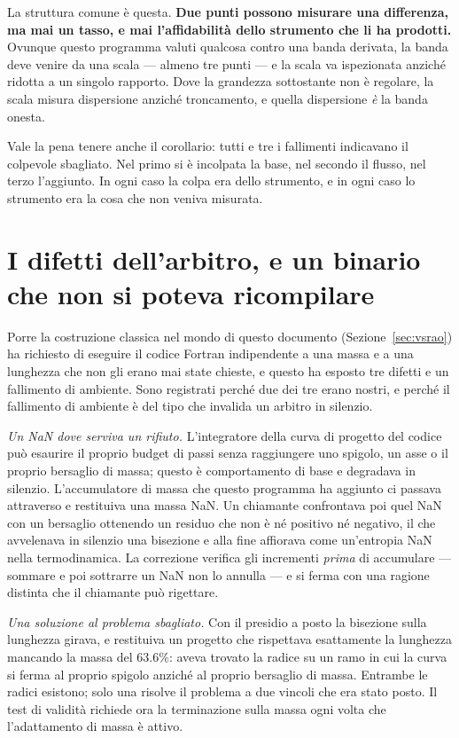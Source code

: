 La struttura comune è questa. \textbf{Due punti possono misurare una
differenza, ma mai un tasso, e mai l'affidabilità dello strumento che
li ha prodotti.} Ovunque questo programma valuti qualcosa contro una
banda derivata, la banda deve venire da una scala --- almeno tre
punti --- e la scala va ispezionata anziché ridotta a un singolo
rapporto. Dove la grandezza sottostante non è regolare, la scala
misura dispersione anziché troncamento, e quella dispersione \emph{è}
la banda onesta.

Vale la pena tenere anche il corollario: tutti e tre i fallimenti
indicavano il colpevole sbagliato. Nel primo si è incolpata la base,
nel secondo il flusso, nel terzo l'aggiunto. In ogni caso la colpa era
dello strumento, e in ogni caso lo strumento era la cosa che non
veniva misurata.

\section{I difetti dell'arbitro, e un binario che non si poteva
ricompilare}
\label{app:geno}

Porre la costruzione classica nel mondo di questo documento
(Sezione~\ref{sec:vsrao}) ha richiesto di eseguire il codice Fortran
indipendente a una massa e a una lunghezza che non gli erano mai state
chieste, e questo ha esposto tre difetti e un fallimento di ambiente.
Sono registrati perché due dei tre erano nostri, e perché il
fallimento di ambiente è del tipo che invalida un arbitro in
silenzio.

\emph{Un NaN dove serviva un rifiuto.} L'integratore della curva di
progetto del codice può esaurire il proprio budget di passi senza
raggiungere uno spigolo, un asse o il proprio bersaglio di massa;
questo è comportamento di base e degradava in silenzio. L'accumulatore
di massa che questo programma ha aggiunto ci passava attraverso e
restituiva una massa NaN. Un chiamante confrontava poi quel NaN con un
bersaglio ottenendo un residuo che non è né positivo né negativo, il
che avvelenava in silenzio una bisezione e alla fine affiorava come
un'entropia NaN nella termodinamica. La correzione verifica gli
incrementi \emph{prima} di accumulare --- sommare e poi sottrarre un
NaN non lo annulla --- e si ferma con una ragione distinta che il
chiamante può rigettare.

\emph{Una soluzione al problema sbagliato.} Con il presidio a posto la
bisezione sulla lunghezza girava, e restituiva un progetto che
rispettava esattamente la lunghezza mancando la massa del $63.6\%$:
aveva trovato la radice su un ramo in cui la curva si ferma al proprio
spigolo anziché al proprio bersaglio di massa. Entrambe le radici
esistono; solo una risolve il problema a due vincoli che era stato
posto. Il test di validità richiede ora la terminazione sulla massa
ogni volta che l'adattamento di massa è attivo.

